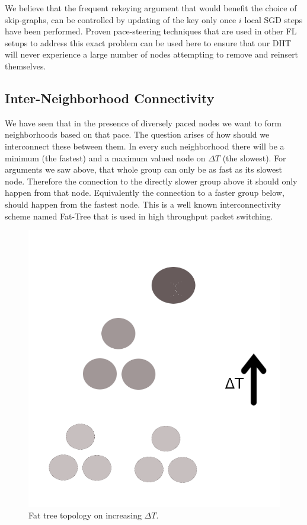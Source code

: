 \documentclass[12pt,notitlepage]{article}
\begin{document}
We believe that the frequent rekeying argument that would benefit the choice of skip-graphs,
can be controlled by updating of the key only once $i$ local SGD steps have been
performed. Proven pace-steering techniques that are used in other FL setups 
to address this exact problem can be used here to ensure that our DHT will never experience a large
number of nodes attempting to remove and reinsert themselves.

\subsection{Inter-Neighborhood Connectivity}
We have seen that in the presence of diversely paced nodes we want to form 
neighborhoods based on that pace. The question arises of how should we 
interconnect these between them. In every such neighborhood there will be
a minimum (the fastest) and a maximum valued node on $\Delta T$ (the slowest).
For arguments we saw above, that whole group can only be as fast as its
slowest node. Therefore the connection to the directly slower group above it
should only happen from that node. Equivalently the connection to a faster 
group below, should happen from the fastest node. This is a well known
interconnectivity scheme named Fat-Tree \cite{fat-trees} that is used in 
high throughput packet switching.
\begin{figure}[h]
\begin{center}
\includegraphics[scale=0.17]{img/fig2.png}
\end{center}
\caption{Fat tree topology on increasing $\Delta T$.}
\end{figure}
\end{document}
